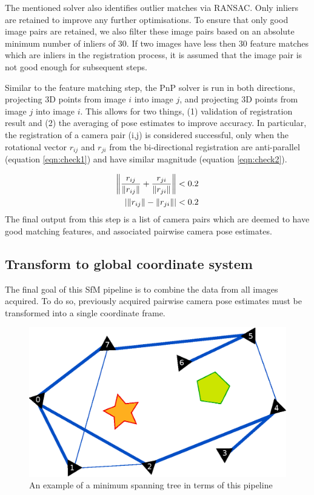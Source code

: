 \documentclass[10pt,twocolumn,letterpaper]{article}
\newcommand{\norm}[1]{\left\lVert #1 \right\rVert}
\DeclarePairedDelimiter\abs{\lvert}{\rvert}
\begin{document}
The mentioned solver also identifies outlier matches via RANSAC. Only inliers
are retained to improve any further optimisations. To ensure that only good
image pairs are retained, we also filter these image pairs based on an absolute
minimum number of inliers of 30. If two images have less then 30 feature matches
which are inliers in the registration process, it is assumed that the image pair
is not good enough for subsequent steps.

Similar to the feature matching step, the PnP solver is run in both directions,
projecting 3D points from image $i$ into image $j$, and projecting 3D points
from image $j$ into image $i$. This allows for two things, (1) validation of registration result and (2) the averaging of
pose estimates to improve accuracy. In particular, the registration of a camera pair (i,j) is considered successful, only when the rotational vector $r_{ij}$ and $r_{ji}$ from the bi-directional registration are anti-parallel (equation \ref{eqn:check1}) and have similar magnitude (equation \ref{eqn:check2}).

\begin{align}
\norm{\frac{r_{ij}}{\norm{r_{ij}}} + \frac{r_{ji}}{\norm{r_{ji}}}} < 0.2
\label{eqn:check1}\\
\abs{\norm{r_{ij}} - \norm{r_{ji}}} < 0.2\label{eqn:check2}
\end{align}
The final output from this step is a list of camera pairs which are deemed to
have good matching features, and associated pairwise camera pose estimates.



\subsection{Transform to global coordinate system}

The final goal of this SfM pipeline is to combine the data from all images
acquired. To do so, previously acquired pairwise camera pose estimates must
be transformed into a single coordinate frame.

\begin{figure}[t]
\begin{center}
   \includegraphics[width=0.9\linewidth]{figures/spanning_tree.eps}
\end{center}
\caption{An example of a minimum spanning tree in terms of this pipeline}
\label{fig:spanning}
\end{figure}
\end{document}
